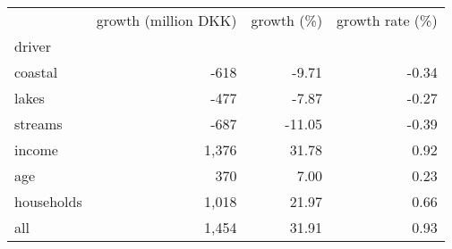 \begin{tabular}{lrrr}
\toprule
 & growth (million DKK) & growth (\%) & growth rate (\%) \\
driver &  &  &  \\
\midrule
coastal & -618 & -9.71 & -0.34 \\
lakes & -477 & -7.87 & -0.27 \\
streams & -687 & -11.05 & -0.39 \\
income & 1,376 & 31.78 & 0.92 \\
age & 370 & 7.00 & 0.23 \\
households & 1,018 & 21.97 & 0.66 \\
all & 1,454 & 31.91 & 0.93 \\
\bottomrule
\end{tabular}
